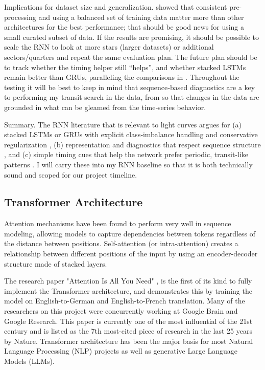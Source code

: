 \documentclass[letterpaper]{article} %
\begin{document}
Implications for dataset size and generalization. \cite{Vida2021findingflaresrecurrent} showed that consistent pre-processing and using a balanced set of training data matter more than other architectures for the best performance; that should be good news for using a small curated subset of data. If the results are promising, it should be possible to scale the RNN to look at more stars (larger datasets) or additional sectors/quarters and repeat the same evaluation plan. The future plan should be to track whether the timing helper still “helps”, and whether stacked LSTMs remain better than GRUs, paralleling the comparisons in \cite{Vida2021findingflaresrecurrent}. Throughout the testing it will be best to keep in mind that sequence‑based diagnostics are a key to performing my transit search in the data, from \cite{kugler2016explorativeapproachkepler} so that changes in the data are grounded in what can be gleamed from the time‑series behavior.

Summary. The RNN literature that is relevant to light curves argues for (a) stacked LSTMs or GRUs with explicit class‑imbalance handling and conservative regularization \cite{Vida2021findingflaresrecurrent}, (b) representation and diagnostics that respect sequence structure \cite{kugler2016explorativeapproachkepler}, and (c) simple timing cues that help the network prefer periodic, transit‑like patterns \cite{Du2016markedtemporalpoint}. I will carry these into my RNN baseline so that it is both technically sound and scoped for our project timeline.

\subsection{Transformer Architecture}
Attention mechanisms have been found to perform very well in sequence modeling, allowing models to capture dependencies between tokens regardless of the distance between positions. Self-attention (or intra-attention) creates a relationship between different positions of the input by using an encoder-decoder structure made of stacked layers.

The research paper "Attention Is All You Need" \cite{vaswani2017attentionneed}, is the first of its kind to fully implement the Transformer architecture, and demonstrates this by training the model on English-to-German and English-to-French translation. Many of the researchers on this project were concurrently working at Google Brain and Google Research. This paper is currently one of the most influential of the 21st century and is listed as the 7th most-cited piece of research in the last 25 years by Nature. Transformer architecture has been the major basis for most Natural Language Processing (NLP) projects as well as generative Large Language Models (LLMs).
\end{document}
